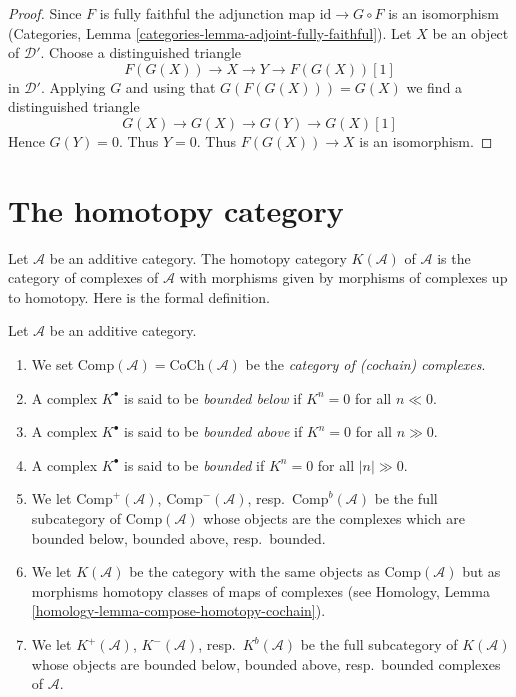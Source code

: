 \begin{proof}
Since $F$ is fully faithful the adjunction map $\text{id} \to G \circ F$
is an isomorphism (Categories, Lemma
\ref{categories-lemma-adjoint-fully-faithful}).
Let $X$ be an object of $\mathcal{D}'$.
Choose a distinguished triangle
$$
F(G(X)) \to X \to Y \to F(G(X))[1]
$$
in $\mathcal{D}'$. Applying $G$ and using that $G(F(G(X))) = G(X)$
we find a distinguished triangle
$$
G(X) \to G(X) \to G(Y) \to G(X)[1]
$$
Hence $G(Y) = 0$. Thus $Y = 0$. Thus $F(G(X)) \to X$ is an isomorphism.
\end{proof}









\section{The homotopy category}
\label{section-homotopy}

\noindent
Let $\mathcal{A}$ be an additive category. The homotopy category
$K(\mathcal{A})$ of $\mathcal{A}$ is the category of complexes of
$\mathcal{A}$ with morphisms given by morphisms of complexes up to homotopy.
Here is the formal definition.

\begin{definition}
\label{definition-complexes-notation}
Let $\mathcal{A}$ be an additive category.
\begin{enumerate}
\item We set $\text{Comp}(\mathcal{A}) = \text{CoCh}(\mathcal{A})$
be the {\it category of (cochain) complexes}.
\item A complex $K^\bullet$ is said to be
{\it bounded below} if $K^n = 0$ for all $n \ll 0$.
\item A complex $K^\bullet$ is said to be
{\it bounded above} if $K^n = 0$ for all $n \gg 0$.
\item A complex $K^\bullet$ is said to be
{\it bounded} if $K^n = 0$ for all $|n| \gg 0$.
\item We let
$\text{Comp}^{+}(\mathcal{A})$, $\text{Comp}^{-}(\mathcal{A})$,
resp.\ $\text{Comp}^b(\mathcal{A})$ be the full subcategory
of $\text{Comp}(\mathcal{A})$ whose objects are the complexes
which are bounded below, bounded above, resp.\ bounded.
\item We let $K(\mathcal{A})$ be the category with the same objects
as $\text{Comp}(\mathcal{A})$ but as morphisms homotopy classes of
maps of complexes (see
Homology, Lemma \ref{homology-lemma-compose-homotopy-cochain}).
\item We let $K^{+}(\mathcal{A})$, $K^{-}(\mathcal{A})$,
resp.\ $K^b(\mathcal{A})$ be the full subcategory of $K(\mathcal{A})$
whose objects are bounded below, bounded above, resp.\ bounded
complexes of $\mathcal{A}$.
\end{enumerate}
\end{definition}

